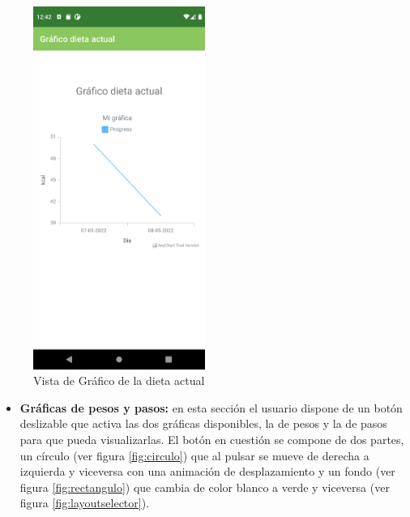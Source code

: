 \begin{figure}[H]
    \centering
    \includegraphics[width=0.5\textwidth]{Images/Capitulo7/grafdietact.png}
    \caption{Vista de Gráfico de la dieta actual}
    \label{fig:grafdietact}
\end{figure}

\begin{itemize}
    \item \textbf{Gráficas de pesos y pasos:} en esta sección el usuario dispone de un botón deslizable que activa las dos gráficas disponibles, la de pesos y la de pasos para que pueda visualizarlas. El botón en cuestión se compone de dos partes, un círculo (ver figura \ref{fig:circulo}) que al pulsar se mueve de derecha a izquierda y viceversa con una animación de desplazamiento y un fondo (ver figura \ref{fig:rectangulo}) que cambia de color blanco a verde y viceversa (ver figura \ref{fig:layoutselector}).
\end{itemize}

